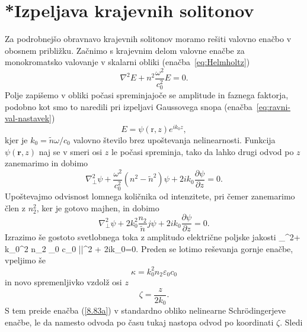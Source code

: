 \section{*Izpeljava krajevnih solitonov}
\label{chap:ks}
Za podrobnejšo obravnavo krajevnih solitonov moramo rešiti valovno 
enačbo v obosnem približku. Začnimo s krajevnim delom valovne 
enačbe za monokromatsko valovanje v skalarni obliki (enačba~\ref{eq:Helmholtz})
\begin{equation}
\nabla^{2}E+n^{2}\frac{\omega^{2}}{c_0^{2}}E=0.
\label{8.80}
\end{equation}
Polje zapišemo v obliki počasi spreminjajoče se amplitude in faznega faktorja, podobno kot 
smo to naredili pri izpeljavi Gaussovega snopa (enačba~\ref{eq:ravni-val-nastavek})
\begin{equation}
E=\psi(\mathrm{r},z)e^{ik_{0}z},
\label{8.81}
\end{equation}
 kjer je $k_{0}=\tilde{n}\omega/c_0$ valovno število brez upoštevanja nelinearnosti.
Funkcija $\psi(\mathbf{r},z)$ naj se v smeri osi $z$ le počasi spreminja, tako da lahko
drugi odvod po $z$ zanemarimo in dobimo 
\begin{equation}
\nabla_{\bot}^{2}\psi+\frac{\omega^{2}}{c_0^{2}}(n^{2}-\tilde{n}^{2})\psi+2ik_{0}
\frac{\partial\psi}{\partial z}=0.
\label{8.82}
\end{equation}
Upoštevajmo odvisnost lomnega količnika od intenzitete, pri čemer
zanemarimo člen z $n_{2}^{2}$, ker je gotovo majhen, in dobimo
\begin{equation}
\nabla_{\bot}^{2}\psi+2k_{0}^{2}\frac{n_{2}}{\tilde{n}}j\psi+2ik_{0}\frac{\partial\psi}{\partial z}=0.
\label{8.83}
\end{equation}
Izrazimo še gostoto svetlobnega toka z amplitudo električne poljske jakosti 
\beq
\nabla_{\bot}^{2}\psi+
k_{0}^{2} n_2 \varepsilon_0 c_0 |\psi|^2 \psi+
2ik_{0}=0.
\label{8.83a}
\eeq
Preden se lotimo reševanja gornje enačbe, vpeljimo še
\begin{equation}
\kappa=k_{0}^{2} n_2 \varepsilon_0 c_0
\end{equation}
 in novo spremenljivko vzdolž osi $z$
\begin{equation}
\zeta=\frac{z}{2k_{0}}.
\end{equation}
 S tem preide enačba (\ref{8.83a}) v standardno obliko nelinearne Schr\"odingerjeve
enačbe, le da namesto odvoda po času tukaj nastopa odvod po koordinati $\zeta$. Sledi
